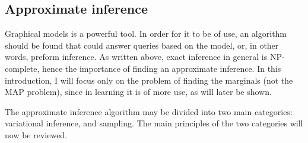 \subsection{Approximate inference}
\label{sec:approx}
Graphical models is a powerful tool.
In order for it to be of use, an algorithm should be found that could answer queries based on the model, or, in other words, preform inference.
As written above, exact inference in general is NP-complete,
hence the importance of finding an approximate inference.
In this introduction, I will focus only on the problem of finding the marginals (not the MAP problem), since in learning it is of more use, as will later be shown.

The approximate inference algorithm may be divided into two main categories: variational inference, and sampling.
The main principles of the two categories will now be reviewed.
